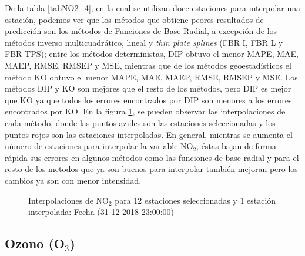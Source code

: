 De la tabla \ref{tabNO2_4}, en la cual se utilizan doce estaciones para interpolar una estación, podemos ver que los métodos que obtiene peores resultados de predicción son los métodos de Funciones de Base Radial, a excepción de los métodos inverso multicuadrático, lineal y {\em thin plate splines} (FBR I,  FBR L y FBR TPS); entre los métodos deterministas, DIP obtuvo el menor MAPE, MAE, MAEP, RMSE, RMSEP y MSE, mientras que de los métodos geoestadísticos el método KO obtuvo el menor MAPE, MAE, MAEP, RMSE, RMSEP y MSE. Los métodos DIP y KO son mejores que el resto de los métodos, pero DIP es mejor que KO ya que todos los errores encontrados por DIP son menores a los errores encontrados por KO. En la figura \ref{NO2figure4}, se pueden observar las interpolaciones de cada método, donde las puntos azules son las estaciones seleccionadas y los puntos rojos son las estaciones interpoladas. En general, mientras se aumenta el número de estaciones para interpolar la variable NO$_{2}$, éstas bajan de forma rápida sus errores en algunos métodos como las funciones de base radial y para el resto de los metodos que ya son buenos para interpolar también mejoran pero los cambios ya son con menor intensidad.



\begin{figure}[H]
\centering
{}
\subfigure[KO] {\texttt{[image: ./ok\_12\_2\_26302]}}
\subfigure[KU] {\texttt{[image: ./uk\_12\_2\_26302]}}
\caption{Interpolaciones de NO$_{2}$ para 12 estaciones seleccionadas y 1 estación interpolada: Fecha (31-12-2018 23:00:00)}
\label{NO2figure4}
\end{figure}





\subsection{Ozono (O$_{3}$)}

